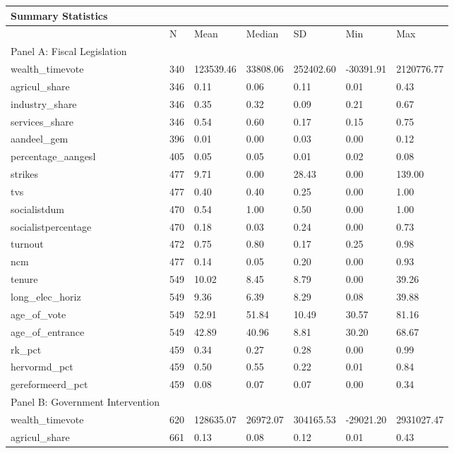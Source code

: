 \captionsetup[table]{labelformat=empty,skip=1pt}
\begin{longtable}{lllllll}
\caption*{
\large Summary Statistics\\ 
} \\ 
\toprule
  & N & Mean & Median & SD & Min & Max \\ 
\midrule
\multicolumn{1}{l}{Panel A: Fiscal Legislation} \\ 
\midrule
wealth\_timevote & 340 & 123539.46 & 33808.06 & 252402.60 & -30391.91 & 2120776.77 \\ 
agricul\_share & 346 & 0.11 & 0.06 & 0.11 & 0.01 & 0.43 \\ 
industry\_share & 346 & 0.35 & 0.32 & 0.09 & 0.21 & 0.67 \\ 
services\_share & 346 & 0.54 & 0.60 & 0.17 & 0.15 & 0.75 \\ 
aandeel\_gem & 396 & 0.01 & 0.00 & 0.03 & 0.00 & 0.12 \\ 
percentage\_aangesl & 405 & 0.05 & 0.05 & 0.01 & 0.02 & 0.08 \\ 
strikes & 477 & 9.71 & 0.00 & 28.43 & 0.00 & 139.00 \\ 
tvs & 477 & 0.40 & 0.40 & 0.25 & 0.00 & 1.00 \\ 
socialistdum & 470 & 0.54 & 1.00 & 0.50 & 0.00 & 1.00 \\ 
socialistpercentage & 470 & 0.18 & 0.03 & 0.24 & 0.00 & 0.73 \\ 
turnout & 472 & 0.75 & 0.80 & 0.17 & 0.25 & 0.98 \\ 
ncm & 477 & 0.14 & 0.05 & 0.20 & 0.00 & 0.93 \\ 
tenure & 549 & 10.02 & 8.45 & 8.79 & 0.00 & 39.26 \\ 
long\_elec\_horiz & 549 & 9.36 & 6.39 & 8.29 & 0.08 & 39.88 \\ 
age\_of\_vote & 549 & 52.91 & 51.84 & 10.49 & 30.57 & 81.16 \\ 
age\_of\_entrance & 549 & 42.89 & 40.96 & 8.81 & 30.20 & 68.67 \\ 
rk\_pct & 459 & 0.34 & 0.27 & 0.28 & 0.00 & 0.99 \\ 
hervormd\_pct & 459 & 0.50 & 0.55 & 0.22 & 0.01 & 0.84 \\ 
gereformeerd\_pct & 459 & 0.08 & 0.07 & 0.07 & 0.00 & 0.34 \\ 
\midrule
\multicolumn{1}{l}{Panel B: Government Intervention} \\ 
\midrule
wealth\_timevote & 620 & 128635.07 & 26972.07 & 304165.53 & -29021.20 & 2931027.47 \\ 
agricul\_share & 661 & 0.13 & 0.08 & 0.12 & 0.01 & 0.43 \\ 

\end{longtable}
